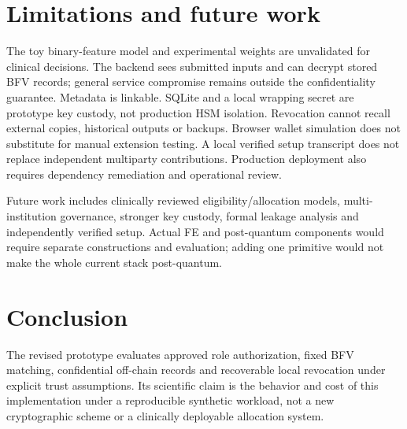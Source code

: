 \documentclass[11pt,a4paper]{article}
\begin{document}
\section{Limitations and future work}
The toy binary-feature model and experimental weights are unvalidated for clinical decisions. The backend sees submitted inputs and can decrypt stored BFV records; general service compromise remains outside the confidentiality guarantee. Metadata is linkable. SQLite and a local wrapping secret are prototype key custody, not production HSM isolation. Revocation cannot recall external copies, historical outputs or backups. Browser wallet simulation does not substitute for manual extension testing. A local verified setup transcript does not replace independent multiparty contributions. Production deployment also requires dependency remediation and operational review.

Future work includes clinically reviewed eligibility/allocation models, multi-institution governance, stronger key custody, formal leakage analysis and independently verified setup. Actual FE and post-quantum components would require separate constructions and evaluation; adding one primitive would not make the whole current stack post-quantum.

\section{Conclusion}
The revised prototype evaluates approved role authorization, fixed BFV matching, confidential off-chain records and recoverable local revocation under explicit trust assumptions. Its scientific claim is the behavior and cost of this implementation under a reproducible synthetic workload, not a new cryptographic scheme or a clinically deployable allocation system.


\end{document}
